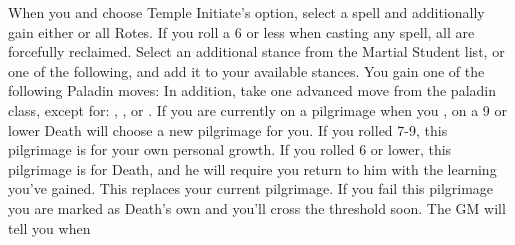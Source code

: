 \documentclass[darkmode]{dw_playbook}
\begin{document}
\pageThree
    {
        \advancedMovesCont
    }
    {
            {
            When you  and choose Temple Initiate's option, select a spell and additionally gain either  or all Rotes.  If you roll a 6 or less when casting any spell, all are forcefully reclaimed.}
        \gap
            {
            Select an additional stance from the Martial Student list, or one of the following, and add it to your available stances.
            \gapSm
            \gapSm
            \gapSm
            }
        \gap
            {
            You gain one of the following Paladin moves:
            \gapSm
            \gapSm
            \gapSm
            In addition, take one advanced move from the paladin class, except for: , , or .}
        \gap
            {If you are currently on a pilgrimage when you , on a 9 or lower Death will choose a new pilgrimage for you.  If you rolled 7-9, this pilgrimage is for your own personal growth.  If you rolled 6 or lower, this pilgrimage is for Death, and he will require you return to him with the learning you’ve gained.  This replaces your current pilgrimage.  If you fail this pilgrimage you are marked as Death’s own and you’ll cross the threshold soon.  The GM will tell you when}
    }
    {
        ~
    }

\end{document}
